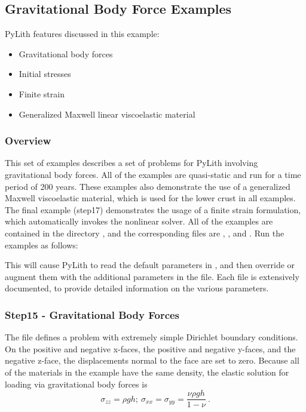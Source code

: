 \subsection{Gravitational Body Force Examples}
\label{sec:example:3dhex8:gravity}

PyLith features discussed in this example:
\begin{itemize}
\item Gravitational body forces
\item Initial stresses
\item Finite strain
\item Generalized Maxwell linear viscoelastic material
\end{itemize}

\subsubsection{Overview}

This set of examples describes a set of problems for PyLith involving
gravitational body forces. All of the examples are quasi-static and
run for a time period of 200 years. These examples also demonstrate
the use of a generalized Maxwell viscoelastic material, which is used
for the lower crust in all examples. The final example (step17)
demonstrates the usage of a finite strain formulation, which
automatically invokes the nonlinear solver. All of the examples are
contained in the directory , and the
corresponding  files are ,
, and .  Run the examples as follows:
This will cause PyLith to read the default parameters in
, and then override or augment them with the
additional parameters in the  file. Each
 file is extensively documented, to provide detailed
information on the various parameters.


\subsubsection{Step15 - Gravitational Body Forces}

The  file defines a problem with extremely simple
Dirichlet boundary conditions. On the positive and negative x-faces,
the positive and negative y-faces, and the negative z-face, the
displacements normal to the face are set to zero. Because all of the
materials in the example have the same density, the elastic solution
for loading via gravitational body forces is
\begin{equation}
\sigma_{zz}=\rho gh;\:\sigma_{xx}=\sigma_{yy}=\frac{\nu\rho gh}{1-\nu}\:.\label{eq:1-1}
\end{equation}

